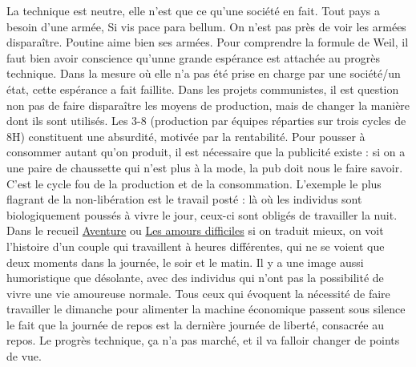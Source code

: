 \documentclass[a4paper,12pt]{book}
\begin{document}
\par La technique est neutre, elle n'est que ce qu'une société en fait. Tout pays a besoin d'une armée, Si vis pace para bellum. On n'est pas près de voir les armées disparaître. Poutine aime bien ses armées. Pour comprendre la formule de Weil, il faut bien avoir conscience qu'unne grande espérance est attachée au progrès technique. Dans la mesure où elle n'a pas été prise en charge par une société/un état, cette espérance a fait faillite. Dans les projets communistes, il est question non pas de faire disparaître les moyens de production, mais de changer la manière dont ils sont utilisés. Les 3-8 (production par équipes réparties sur trois cycles de 8H) constituent une absurdité, motivée par la rentabilité. Pour pousser à consommer autant qu'on produit, il est nécessaire que la publicité existe : si on a une paire de chaussette qui n'est plus à la mode, la pub doit nous le faire savoir. C'est le cycle fou de la production et de la consommation. L'exemple le plus flagrant de la non-libération est le travail posté : là où les individus sont biologiquement poussés à vivre le jour, ceux-ci sont obligés de travailler la nuit. Dans le recueil \underline{Aventure} ou \underline{Les amours difficiles} si on traduit mieux, on voit l'histoire d'un couple qui travaillent à heures différentes, qui ne se voient que deux moments dans la journée, le soir et le matin. Il y a une image aussi humoristique que désolante, avec des individus qui n'ont pas la possibilité de vivre une vie amoureuse normale. Tous ceux qui évoquent la nécessité de faire travailler le dimanche pour alimenter la machine économique passent sous silence le fait que la journée de repos est la dernière journée de liberté, consacrée au repos. Le progrès technique, ça n'a pas marché, et il va falloir changer de points de vue.
\end{document}
